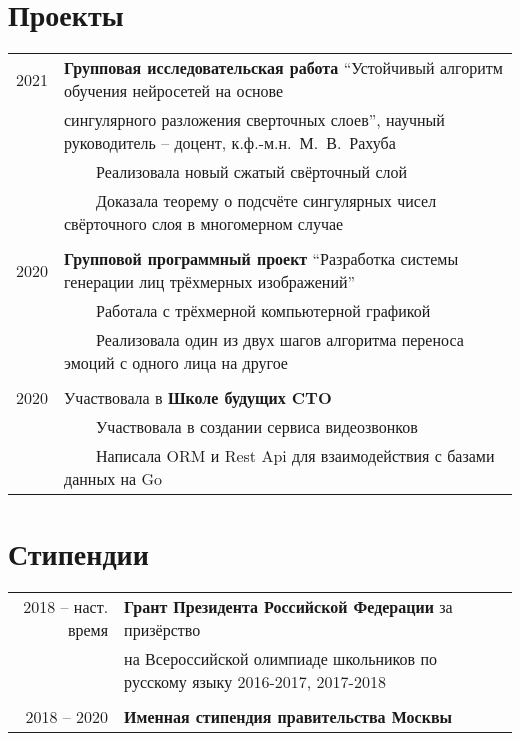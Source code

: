 \documentclass[a4paper,10pt]{article}
\newcommand{\tabitem}{~~\llap{\textbullet}~~}
\begin{document}
\section{Проекты}
\begin{tabular}{rl}
\hspace{0.9cm} 2021 & \textbf{Групповая исследовательская работа} ``Устойчивый алгоритм обучения нейросетей на основе \\
& сингулярного разложения сверточных слоев'', научный руководитель -- доцент, к.ф.-м.н.~М.~В.~Рахуба \\
& \tabitem Реализовала новый сжатый свёрточный слой \\
& \tabitem Доказала теорему о подсчёте сингулярных чисел свёрточного слоя в многомерном случае \\
& \\
\hspace{0.9cm} 2020 & \textbf{Групповой программный проект} ``Разработка системы генерации лиц трёхмерных изображений'' \\
& \tabitem Работала с трёхмерной компьютерной графикой \\
& \tabitem Реализовала один из двух шагов алгоритма переноса эмоций с одного лица на другое\\
&\\
\hspace{0.9cm} 2020 & Участвовала в \textbf{Школе будущих CTO} \\
& \tabitem Участвовала в создании сервиса видеозвонков \\
& \tabitem Написала ORM и Rest Api для взаимодействия с базами данных на Go \\
\end{tabular}

\section{Стипендии}
\begin{tabular}{rl}
2018 -- наст. время & \textbf{Грант Президента Российской Федерации} за призёрство \\
& на Всероссийской олимпиаде школьников по русскому языку 2016-2017, 2017-2018 \\
&\\
2018 -- 2020 & \textbf{Именная стипендия правительства Москвы} \\
\end{tabular}
\end{document}

